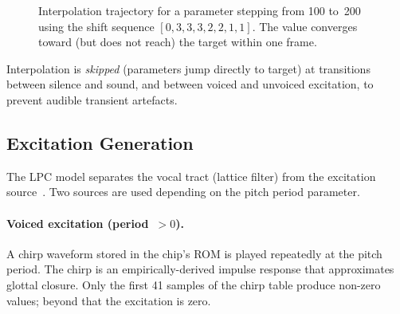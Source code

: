 \documentclass[10pt]{article}
\begin{document}
\begin{figure}[H]
\centering
{}
\caption{Interpolation trajectory for a parameter stepping from 100 to~200
  using the shift sequence $[0,3,3,3,2,2,1,1]$.  The value converges
  toward (but does not reach) the target within one frame.}
\label{fig:interp}
\end{figure}

Interpolation is \emph{skipped} (parameters jump directly to target) at
transitions between silence and sound, and between voiced and unvoiced
excitation, to prevent audible transient artefacts.

\subsection{Excitation Generation}

The LPC model separates the vocal tract (lattice filter) from the excitation
source~\cite{Rabiner1978,Atal1971}.  Two sources are used depending on the pitch period parameter.

\paragraph{Voiced excitation (period~$> 0$).}
A chirp waveform stored in the chip's ROM is played repeatedly at the pitch
period.  The chirp is an empirically-derived impulse response that
approximates glottal closure.  Only the first 41 samples of the chirp table
produce non-zero values; beyond that the excitation is zero.
\end{document}
